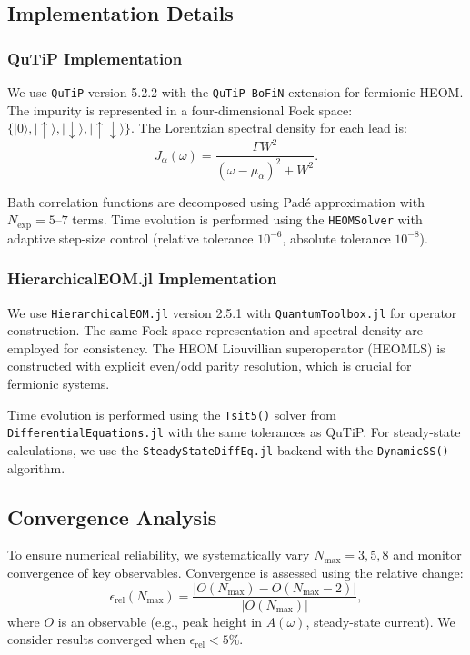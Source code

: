 \documentclass[preprint,1p]{elsarticle}
\begin{document}
\subsection{Implementation Details}

\subsubsection{QuTiP Implementation}

We use \texttt{QuTiP} version 5.2.2 with the \texttt{QuTiP-BoFiN} extension for fermionic HEOM. The impurity is represented in a four-dimensional Fock space: $\{|0\rangle, |\uparrow\rangle, |\downarrow\rangle, |\uparrow\downarrow\rangle\}$. The Lorentzian spectral density for each lead is:
\begin{equation}
J_\alpha(\omega) = \frac{\Gamma W^2}{(\omega - \mu_\alpha)^2 + W^2}.
\label{eq:spectral_density}
\end{equation}

Bath correlation functions are decomposed using Padé approximation with $N_{\text{exp}} = 5$--$7$ terms. Time evolution is performed using the \texttt{HEOMSolver} with adaptive step-size control (relative tolerance $10^{-6}$, absolute tolerance $10^{-8}$).

\subsubsection{HierarchicalEOM.jl Implementation}

We use \texttt{HierarchicalEOM.jl} version 2.5.1 with \texttt{QuantumToolbox.jl} for operator construction. The same Fock space representation and spectral density are employed for consistency. The HEOM Liouvillian superoperator (HEOMLS) is constructed with explicit even/odd parity resolution, which is crucial for fermionic systems.

Time evolution is performed using the \texttt{Tsit5()} solver from \texttt{DifferentialEquations.jl} with the same tolerances as QuTiP. For steady-state calculations, we use the \texttt{SteadyStateDiffEq.jl} backend with the \texttt{DynamicSS()} algorithm.

\subsection{Convergence Analysis}

To ensure numerical reliability, we systematically vary $N_{\text{max}} = 3, 5, 8$ and monitor convergence of key observables. Convergence is assessed using the relative change:
\begin{equation}
\epsilon_{\text{rel}}(N_{\text{max}}) = \frac{|O(N_{\text{max}}) - O(N_{\text{max}}-2)|}{|O(N_{\text{max}})|},
\end{equation}
where $O$ is an observable (e.g., peak height in $A(\omega)$, steady-state current). We consider results converged when $\epsilon_{\text{rel}} < 5\%$.
\end{document}
